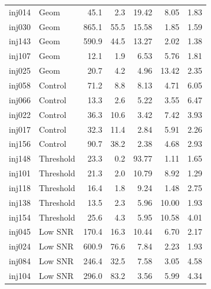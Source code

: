 \documentclass{aa}
\begin{document}
\begin{appendix}
\begin{table}[ht!]
\begin{tabular}{llrrrrr}
inj014 & Geom & 45.1 & 2.3 & 19.42 & 8.05 & 1.83 \\
inj030 & Geom & 865.1 & 55.5 & 15.58 & 1.85 & 1.59 \\
inj143 & Geom & 590.9 & 44.5 & 13.27 & 2.02 & 1.38 \\
inj107 & Geom & 12.1 & 1.9 & 6.53 & 5.76 & 1.81 \\
inj025 & Geom & 20.7 & 4.2 & 4.96 & 13.42 & 2.35 \\
\noalign{\smallskip}
inj058 & Control & 71.2 & 8.8 & 8.13 & 4.71 & 6.05 \\
inj066 & Control & 13.3 & 2.6 & 5.22 & 3.55 & 6.47 \\
inj022 & Control & 36.3 & 10.6 & 3.42 & 7.42 & 3.93 \\
inj017 & Control & 32.3 & 11.4 & 2.84 & 5.91 & 2.26 \\
inj156 & Control & 90.7 & 38.2 & 2.38 & 4.68 & 2.93 \\
\noalign{\smallskip}
inj148 & Threshold & 23.3 & 0.2 & 93.77 & 1.11 & 1.65 \\
inj101 & Threshold & 21.3 & 2.0 & 10.79 & 8.92 & 1.29 \\
inj118 & Threshold & 16.4 & 1.8 & 9.24 & 1.48 & 2.75 \\
inj138 & Threshold & 13.5 & 2.3 & 5.96 & 10.00 & 1.93 \\
inj154 & Threshold & 25.6 & 4.3 & 5.95 & 10.58 & 4.01 \\
\noalign{\smallskip}
inj045 & Low SNR & 170.4 & 16.3 & 10.44 & 6.70 & 2.17 \\
inj024 & Low SNR & 600.9 & 76.6 & 7.84 & 2.23 & 1.93 \\
inj084 & Low SNR & 246.4 & 32.5 & 7.58 & 3.05 & 4.58 \\
inj104 & Low SNR & 296.0 & 83.2 & 3.56 & 5.99 & 4.34 \\
\hline
\end{tabular}
\end{table}


\FloatBarrier %
\twocolumn















\end{appendix}
\end{document}
